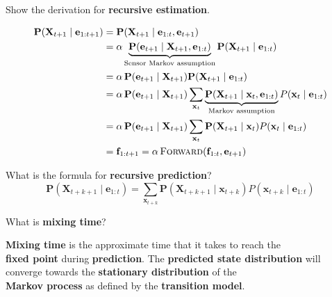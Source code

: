 \begin{flashcard}[Question]{Show the derivation for \textbf{recursive estimation}.}
\begin{center}
{\begin{align*}
\mathbf{P}(\mathbf{X}_{t+1} \mid \mathbf{e}_{1:t+1})
&= \mathbf{P}(\mathbf{X}_{t+1} \mid \mathbf{e}_{1:t}, \mathbf{e}_{t+1})\\
&= \alpha \underbrace{\mathbf{P}(\mathbf{e}_{t+1} \mid \mathbf{X}_{t+1}, \mathbf{e}_{1:t})}_\text{Sensor Markov assumption} \mathbf{P}(\mathbf{X}_{t+1} \mid \mathbf{e}_{1:t})\\
&= \alpha\, \mathbf{P}(\mathbf{e}_{t+1} \mid \mathbf{X}_{t+1}) \mathbf{P}(\mathbf{X}_{t+1} \mid \mathbf{e}_{1:t})\\
&= \alpha\, \mathbf{P}(\mathbf{e}_{t+1} \mid \mathbf{X}_{t+1}) \sum_{\mathbf{x}_t} \underbrace{\mathbf{P}(\mathbf{X}_{t+1} \mid \mathbf{x}_t, \mathbf{e}_{1:t})}_\text{Markov assumption} P(\mathbf{x}_t \mid \mathbf{e}_{1:t})\\
&= \alpha\, \mathbf{P}(\mathbf{e}_{t+1} \mid \mathbf{X}_{t+1}) \sum_{\mathbf{x}_t} \mathbf{P}(\mathbf{X}_{t+1} \mid \mathbf{x}_t) P(\mathbf{x}_t \mid \mathbf{e}_{1:t})\\
&= \mathbf{f}_{1:t+1} = \alpha\, \textsc{Forward}(\mathbf{f}_{1:t}, \mathbf{e}_{t+1})
\end{align*}}
\end{center}
\end{flashcard}

\begin{flashcard}[Question]{What is the formula for \textbf{recursive prediction}?}
\begin{displaymath}
\mathbf{P}(\mathbf{X}_{t+k+1} \mid \mathbf{e}_{1:t}) = \sum_{\mathbf{x}_{t+k}} \mathbf{P}(\mathbf{X}_{t+k+1} \mid \mathbf{x}_{t+k}) P(\mathbf{x}_{t+k} \mid \mathbf{e}_{1:t})
\end{displaymath}
\end{flashcard}

\begin{flashcard}[Question]{What is \textbf{mixing time}?}
\begin{center}
\textbf{Mixing time} is the approximate time that it takes to reach the\\\textbf{fixed point} during \textbf{prediction}. The \textbf{predicted state distribution} will converge towards the \textbf{stationary distribution} of the\\\textbf{Markov process} as defined by the \textbf{transition model}.
\end{center}
\end{flashcard}

